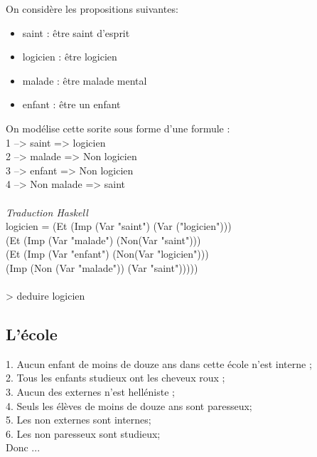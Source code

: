 \documentclass{article}
\begin{document}
On considère les propositions suivantes:
\begin{itemize}
    \item saint : être saint d'esprit
    \item logicien : être logicien
    \item malade : être malade mental
    \item enfant : être un enfant\\
\end{itemize}
On modélise cette sorite sous forme d'une formule :\\
1 --> saint => logicien\\
2 --> malade => Non logicien\\
3 --> enfant => Non logicien\\
4 --> Non malade => saint
\\ \\
\emph{Traduction Haskell}\\
logicien = (Et (Imp (Var "saint") (Var ("logicien")))\\
    \tabto{18mm}(Et (Imp (Var "malade") (Non(Var "saint")))\\
    \tabto{20mm}(Et (Imp (Var "enfant") (Non(Var "logicien")))\\
    \tabto{22mm}(Imp (Non (Var "malade")) (Var "saint")))))\\
\\
> deduire logicien\\

\subsection{L'école}

\tabto{0mm}1. Aucun enfant de moins de douze ans dans cette école n’est interne ;\\
2. Tous les enfants studieux ont les cheveux roux ;\\
3. Aucun des externes n’est helléniste ;\\
4. Seuls les élèves de moins de douze ans sont paresseux;\\
5. Les non externes sont internes;\\
6. Les non paresseux sont studieux;\\
Donc ...\\
\end{document}
